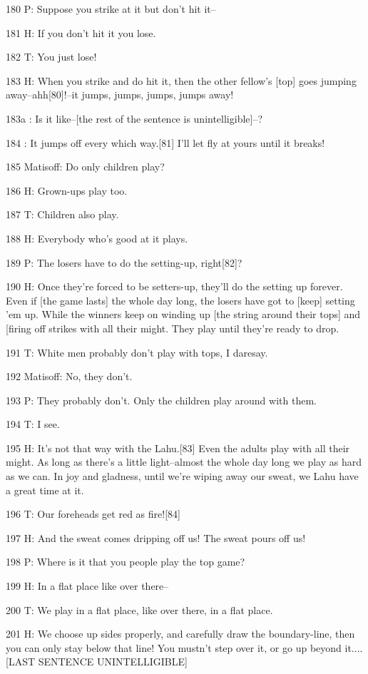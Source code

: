 180 P: Suppose you strike at it but don't hit it--

181 H: If you don't hit it you lose.

182 T: You just lose!

183 H: When you strike and do hit it, then the other fellow's [top] goes jumping
away--ahh[80]!--it jumps, jumps, jumps, jumps away!

183a  : Is it like--[the rest of the sentence is unintelligible]--?

184    : It jumps off every which way.[81] I'll let fly at yours until it breaks!

185 Matisoff: Do only children play?

186 H: Grown-ups play too.

187 T: Children also play.

188 H: Everybody who's good at it plays.

189 P: The losers have to do the setting-up, right[82]?

190 H: Once they're forced to be setters-up, they'll do the setting up forever.
Even if [the game lasts] the whole day long, the losers have got to [keep] setting
'em up. While the winners keep on winding up [the string around their tops] and
[firing off strikes with all their might. They play until they're ready to drop.

191 T: White men probably don't play with tops, I daresay.

192 Matisoff: No, they don't.

193 P: They probably don't. Only the children play around with them.

194 T: I see.

195 H: It's not that way with the Lahu.[83] Even the adults play with all their
might. As long as there's a little light--almost the whole day long we play as
hard as we can. In joy and gladness, until we're wiping away our sweat, we Lahu
have a great time at it.

196 T: Our foreheads get red as fire![84]

197 H: And the sweat comes dripping off us! The sweat pours off us!

198 P: Where is it that you people play the top game?

199 H: In a flat place like over there--

200 T: We play in a flat place, like over there, in a flat place.

201 H: We choose up sides properly, and carefully draw the boundary-line, then
you can only stay below that line! You mustn't step over it, or go up beyond it....
[LAST SENTENCE UNINTELLIGIBLE]

